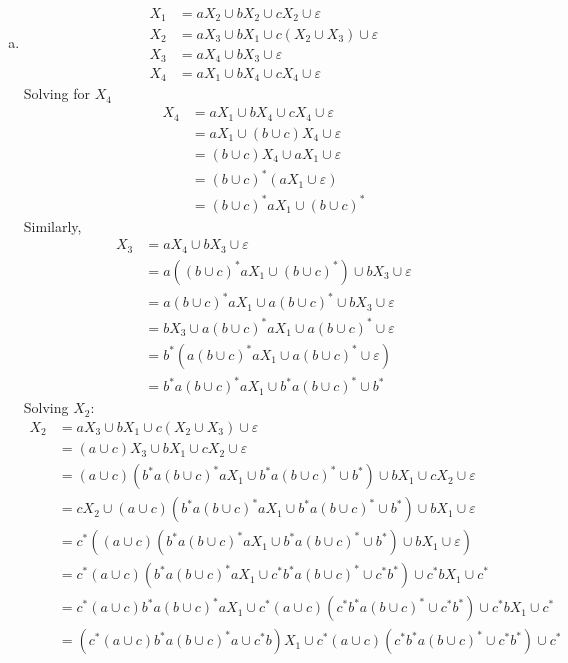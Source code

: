 \begin{solution}
    \begin{enumerate}[(a)]
        \item 
        
        \begin{align*}
            X_1 &= aX_2\cup bX_2\cup cX_2\cup\varepsilon\\
            X_2 &= aX_3\cup bX_1 \cup c(X_2\cup X_3)\cup\varepsilon\\
            X_3 &= aX_4\cup bX_3\cup\varepsilon\\
            X_4 &= aX_1\cup bX_4\cup cX_4\cup\varepsilon  
        \end{align*}
        Solving for \(X_4\) 
        \begin{align*}
            X_4 &= aX_1\cup bX_4\cup cX_4\cup\varepsilon\\
                &= aX_1\cup (b\cup c)X_4\cup\varepsilon\\
                &= (b\cup c)X_4\cup aX_1\cup\varepsilon\\
                &= (b\cup c)^*(aX_1\cup\varepsilon)\\
                &= (b\cup c)^*aX_1\cup (b\cup c)^*
        \end{align*}
    Similarly, 
        \begin{align*}
            X_3 &= aX_4\cup bX_3\cup\varepsilon\\
                &= a\left((b\cup c)^*aX_1\cup (b\cup c)^*\right)\cup bX_3\cup\varepsilon\\
                &= a(b\cup c)^*aX_1\cup a(b\cup c)^*\cup bX_3\cup\varepsilon\\
                &= bX_3\cup a(b\cup c)^*aX_1\cup a(b\cup c)^*\cup\varepsilon\\
                &= b^*(a(b\cup c)^*aX_1\cup a(b\cup c)^*\cup\varepsilon)\\
                &= b^*a(b\cup c)^*aX_1\cup b^*a(b\cup c)^*\cup b^*
        \end{align*}
    Solving \(X_2\):
    \begin{align*}
        X_2 &= aX_3\cup bX_1 \cup c(X_2\cup X_3)\cup\varepsilon\\
            &= (a\cup c)X_3 \cup bX_1 \cup cX_2\cup\varepsilon\\
            &= (a\cup c)(b^*a(b\cup c)^*aX_1\cup b^*a(b\cup c)^*\cup b^*)\cup bX_1 \cup cX_2\cup\varepsilon\\
            &= cX_2\cup (a\cup c)(b^*a(b\cup c)^*aX_1\cup b^*a(b\cup c)^*\cup b^*)\cup bX_1\cup\varepsilon\\
            &= c^*((a\cup c)(b^*a(b\cup c)^*aX_1\cup b^*a(b\cup c)^*\cup b^*)\cup bX_1\cup\varepsilon)\\
            &= c^*(a\cup c)(b^*a(b\cup c)^*aX_1\cup c^*b^*a(b\cup c)^*\cup c^*b^*)\cup c^*bX_1\cup c^*\\
            &= c^*(a\cup c)b^*a(b\cup c)^*aX_1\cup c^*(a\cup c)(c^*b^*a(b\cup c)^*\cup c^*b^*)\cup c^*bX_1\cup c^*\\
            &= (c^*(a\cup c)b^*a(b\cup c)^*a\cup c^*b)X_1\cup c^*(a\cup c)(c^*b^*a(b\cup c)^*\cup c^*b^*)\cup c^*
    \end{align*}


\end{enumerate}
\end{solution}
